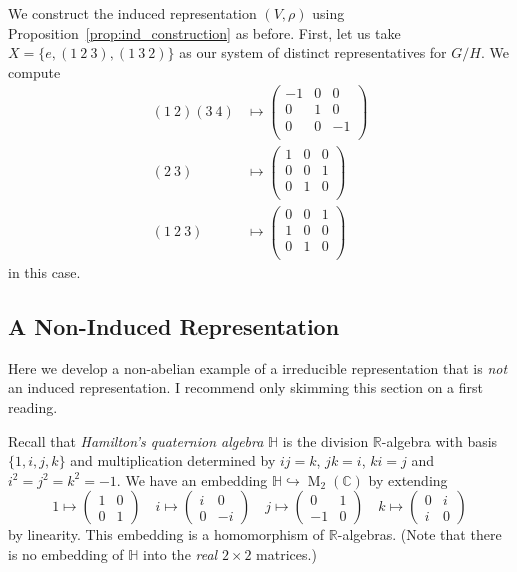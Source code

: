 \documentclass[12pt]{article}
\theoremstyle{plain}
\theoremstyle{definition}
\theoremstyle{remark}
\numberwithin{equation}{section}
\begin{document}
We construct the induced representation $(V,\rho)$ using
Proposition~\ref{prop:ind_construction} as before.
First, let us take $X=\{ e, (1\ 2\ 3), (1\ 3\ 2) \}$ as our system of
distinct representatives for $G/H$.
We compute
\begin{align*}
(1\ 2)(3\ 4)&\mapsto
\begin{pmatrix}
-1 & 0 & 0\\
0 & 1 & 0\\
0 & 0 & -1\\
\end{pmatrix}\\
(2\ 3)&\mapsto
\begin{pmatrix}
1 & 0 & 0\\
0 & 0 & 1\\
0 & 1 & 0\\
\end{pmatrix}\\
(1\ 2\ 3)&\mapsto
\begin{pmatrix}
0 & 0 & 1\\
1 & 0 & 0\\
0 & 1 & 0\\
\end{pmatrix}
\end{align*}
in this case.

\subsection{A Non-Induced Representation}

Here we develop a non-abelian example of a irreducible representation
that is \emph{not} an induced representation.
I recommend only skimming this section on a first reading.

Recall that \emph{Hamilton's quaternion algebra} $\mathbb{H}$
is the division $\mathbb{R}$-algebra
with basis $\{1,i,j,k\}$ and multiplication determined by
$ij=k$, $jk=i$, $ki=j$ and $i^2=j^2=k^2=-1$.
We have an embedding
$\mathbb{H} \hookrightarrow \operatorname{M}_2(\mathbb{C})$
by extending
\[
1 \mapsto \begin{pmatrix} 1&0\\0&1 \end{pmatrix} \quad
i \mapsto \begin{pmatrix} i&0\\0&-i \end{pmatrix} \quad
j \mapsto \begin{pmatrix} 0&1\\-1&0 \end{pmatrix} \quad
k \mapsto \begin{pmatrix} 0&i\\i&0 \end{pmatrix}
\]
by linearity.
This embedding is a homomorphism of $\mathbb{R}$-algebras.
(Note that there is no embedding of $\mathbb{H}$ into
the \emph{real} $2\times 2$ matrices.)
\end{document}
